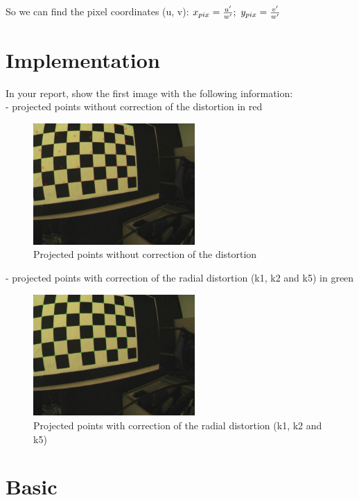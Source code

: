 \documentclass[a4paper, twoside, english]{article}
\begin{document}
{So we can find the pixel coordinates (u, v):
$x_{pix}={{u'}\over{w'}}; \ y_{pix}={{v'}\over{w'}}$

\section{Implementation}

In your report, show the first image with the following information:\\
- projected points without correction of the distortion in red

\begin{figure}[h!]
	\centerline{\includegraphics[width=0.55\textwidth]{wCorr.png}}
	\caption[wCorr]{Projected points without correction of the distortion}
	\label{fig:wCorr}
\end{figure}
- projected points with correction of the radial distortion (k1, k2 and k5) in green

\begin{figure}[h!]
	\centerline{\includegraphics[width=0.55\textwidth]{Corr.png}}
	\caption[Corr]{ Projected points with correction of the radial distortion (k1, k2 and k5)}
	\label{fig:Corr}
\end{figure}

\section{Basic}

}
\end{document}

